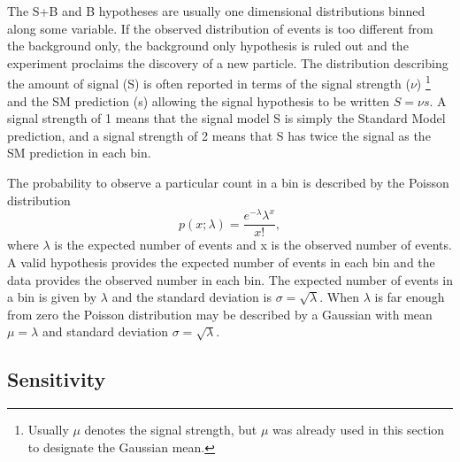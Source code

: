 The S+B and B hypotheses are usually one dimensional distributions binned along some variable. If the observed distribution of events is too different from the background only, the background only hypothesis is ruled out and the experiment proclaims the discovery of a new particle. The distribution describing the amount of signal (S) is often reported in terms of the signal strength ($\nu$) \footnote{Usually $\mu$ denotes the signal strength, but $\mu$ was already used in this section to designate the Gaussian mean.} and the SM prediction (s) allowing the signal hypothesis to be written $S = \nu s$. A signal strength of 1 means that the signal model S is simply the Standard Model prediction, and a signal strength of 2 means that S has twice the signal as the SM prediction in each bin.  

The probability to observe a particular count in a bin is described by the Poisson distribution
\begin{equation}
p\left( x; \lambda \right) = \frac{{e^{ - \lambda } \lambda^x }}{{x!}},
\end{equation}
where $\lambda$ is the expected number of events and x is the observed number of events. A valid hypothesis provides the expected number of events in each bin and the data provides the observed number in each bin. The expected number of events in a bin is given by $\lambda$ and the standard deviation is $\sigma = \sqrt{\lambda}$. When $\lambda$ is far enough from zero the Poisson distribution may be described by a Gaussian with mean $\mu = \lambda$ and standard deviation $\sigma = \sqrt{\lambda}$.  

\subsection{Sensitivity}
\label{sensitivity}

